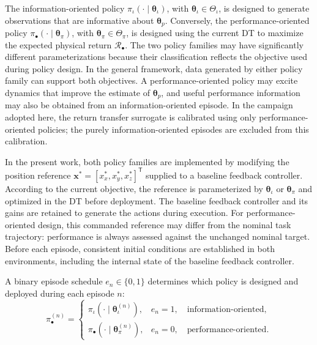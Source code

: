 \documentclass[journal]{IEEEtran}
\begin{document}
The information-oriented policy $\pi_{\iota}(\cdot\mid\boldsymbol{\theta}_{\iota})$, with $\boldsymbol{\theta}_{\iota}\in\Theta_{\iota}$, is designed to generate observations that are informative about $\boldsymbol{\theta}_{p}$. Conversely, the performance-oriented policy $\pi_{\bullet}(\cdot\mid\boldsymbol{\theta}_{\pi})$, with $\boldsymbol{\theta}_{\pi}\in\Theta_{\pi}$, is designed using the current DT to maximize the expected physical return $\mathcal R_\bullet$. The two policy families may have significantly different parameterizations because their classification reflects the objective used during policy design. In the general framework, data generated by either policy family can support both objectives. A performance-oriented policy may excite dynamics that improve the estimate of $\boldsymbol{\theta}_p$, and useful performance information may also be obtained from an information-oriented episode. In the campaign adopted here, the return transfer surrogate is calibrated using only performance-oriented policies; the purely information-oriented episodes are excluded from this calibration.

In the present work, both policy families are implemented by modifying the position reference $\mathbf{x}^{\ast}=[x_x^{\ast},x_y^{\ast},x_z^{\ast}]^{\mathsf T}$ supplied to a baseline feedback controller. According to the current objective, the reference is parameterized by $\boldsymbol{\theta}_{\iota}$ or $\boldsymbol{\theta}_{\pi}$ and optimized in the DT before deployment. The baseline feedback controller and its gains are retained to generate the actions during execution. For performance-oriented design, this commanded reference may differ from the nominal task trajectory: performance is always assessed against the unchanged nominal target. Before each episode, consistent initial conditions are established in both environments, including the internal state of the baseline feedback controller.

A binary episode schedule $e_n\in\{0,1\}$ determines which policy is designed and deployed during each episode $n$:
\begin{equation}
\pi_{\bullet}^{(n)}=
\begin{cases}
\pi_{\iota}\!\left(\cdot\mid\boldsymbol{\theta}_{\iota}^{(n)}\right),
& e_n=1,\quad \text{information-oriented},\\[2mm]
\pi_{\bullet}\!\left(\cdot\mid\boldsymbol{\theta}_{\pi}^{(n)}\right),
& e_n=0,\quad \text{performance-oriented}.
\end{cases}
\label{eq:rt-policy-schedule}
\end{equation}
\end{document}
